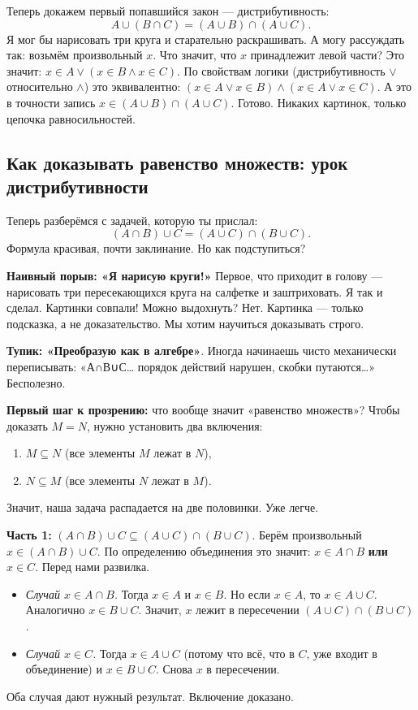 Теперь докажем первый попавшийся закон — дистрибутивность:
\[
A \cup (B \cap C) = (A \cup B) \cap (A \cup C).
\]
Я мог бы нарисовать три круга и старательно раскрашивать. А могу рассуждать так: возьмём произвольный $x$. Что значит, что $x$ принадлежит левой части? Это значит: $x \in A \lor (x \in B \land x \in C)$. По свойствам логики (дистрибутивность $\lor$ относительно $\land$) это эквивалентно: $(x \in A \lor x \in B) \land (x \in A \lor x \in C)$. А это в точности запись $x \in (A \cup B) \cap (A \cup C)$. Готово. Никаких картинок, только цепочка равносильностей.

\subsection{Как доказывать равенство множеств: урок дистрибутивности}
\label{sec:distrib-proof}

Теперь разберёмся с задачей, которую ты прислал:
\[
(A \cap B) \cup C = (A \cup C) \cap (B \cup C).
\]
Формула красивая, почти заклинание. Но как подступиться?

\textbf{Наивный порыв: «Я нарисую круги!»} Первое, что приходит в голову — нарисовать три пересекающихся круга на салфетке и заштриховать. Я так и сделал. Картинки совпали! Можно выдохнуть? Нет. Картинка — только подсказка, а не доказательство. Мы хотим научиться доказывать строго.

\textbf{Тупик: «Преобразую как в алгебре»}. Иногда начинаешь чисто механически переписывать: «А∩В∪С… порядок действий нарушен, скобки путаются…» Бесполезно.

\textbf{Первый шаг к прозрению:} что вообще значит «равенство множеств»? Чтобы доказать $M = N$, нужно установить два включения:
\begin{enumerate}
  \item $M \subseteq N$ (все элементы $M$ лежат в $N$),
  \item $N \subseteq M$ (все элементы $N$ лежат в $M$).
\end{enumerate}
Значит, наша задача распадается на две половинки. Уже легче.

\textbf{Часть 1:} $(A \cap B) \cup C \subseteq (A \cup C) \cap (B \cup C)$.
Берём произвольный $x \in (A \cap B) \cup C$. По определению объединения это значит: $x \in A \cap B$ \textbf{или} $x \in C$. Перед нами развилка.
\begin{itemize}
  \item \textit{Случай $x \in A \cap B$.} Тогда $x \in A$ и $x \in B$. Но если $x \in A$, то $x \in A \cup C$. Аналогично $x \in B \cup C$. Значит, $x$ лежит в пересечении $(A \cup C) \cap (B \cup C)$.
  \item \textit{Случай $x \in C$.} Тогда $x \in A \cup C$ (потому что всё, что в $C$, уже входит в объединение) и $x \in B \cup C$. Снова $x$ в пересечении.
\end{itemize}
Оба случая дают нужный результат. Включение доказано.

